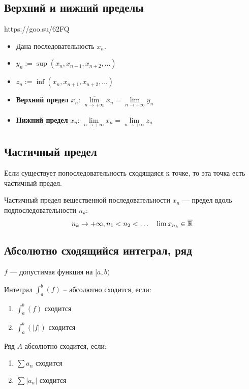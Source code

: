 \documentclass[../main.tex]{subfiles}
\begin{document}
\subsection{Верхний и нижний пределы}
https://goo.su/62FQ

\begin{itemize}
    \item Дана последовательность $x_n$.
    \item $y_n:=\sup(x_n, x_{n+1}, x_{n+2},\ldots)$
    \item $z_n:=\inf(x_n, x_{n+1}, x_{n+2},\ldots)$
\end{itemize}

\begin{itemize}
    \item \textbf{Верхний предел} $x_n$: $\overline{\lim\limits_{n\to+\infty}} x_n = \lim\limits_{n\to+\infty}y_n$
    \item \textbf{Нижний предел} $x_n$: $\underline{\lim\limits_{n\to+\infty}} x_n = \lim\limits_{n\to+\infty}z_n$
\end{itemize}


\subsection{Частичный предел}
    Если существует попоследовательность сходящаяся к точке, то эта точка есть частичный предел.
    \newline
    
    Частичный предел вещественной последовательности $x_n$ --- предел вдоль подпоследовательности $n_k$:
    $$n_k\to+\infty, n_1<n_2<\ldots \quad \lim x_{n_k}\in\overline{\mathbb{R}}$$


\subsection{Абсолютно сходящийся интеграл, ряд}
$f$ --- допустимая функция на $[a, b)$
\newline
\newline

Интеграл $\int_a^b (f)$ -- абсолютно сходится, если:
\begin{enumerate}
    \item $\int_a^b (f)$ сходится
    \item $\int_a^b (|f|)$ сходится
\end{enumerate}

Ряд $A$ абсолютно сходится, если:
\begin{enumerate}
    \item $\sum a_n$ сходится
    \item $\sum |a_n|$ сходится
\end{enumerate}
\end{document}
